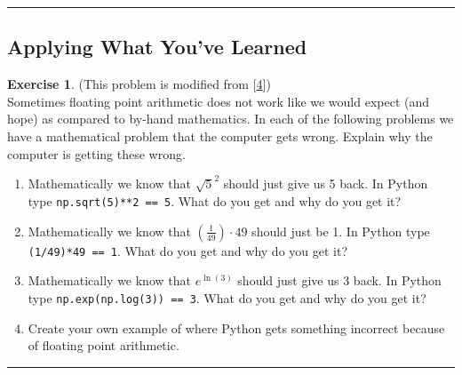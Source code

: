\documentclass[
]{book}
\providecommand{\tightlist}{%
  \setlength{\itemsep}{0pt}\setlength{\parskip}{0pt}}
\theoremstyle{definition}
\theoremstyle{definition}
\theoremstyle{definition}
\newtheorem{exercise}{Exercise}[chapter]
\theoremstyle{remark}
\begin{document}
\begin{center}\rule{0.5\linewidth}{0.5pt}\end{center}

\hypertarget{applying-what-youve-learned}{%
\subsection{Applying What You've Learned}\label{applying-what-youve-learned}}

\begin{exercise}
\protect\hypertarget{exr:unnamed-chunk-62}{}{\label{exr:unnamed-chunk-62} }(This problem is modified from {[}\protect\hyperlink{ref-chartier}{4}{]})\\
Sometimes floating point arithmetic does not work like we would expect (and hope) as compared to by-hand mathematics. In each of the following problems we have a mathematical problem that the computer gets wrong. Explain why the computer is getting these wrong.

\begin{enumerate}
\def\labelenumi{\alph{enumi}.}
\tightlist
\item
  Mathematically we know that \(\sqrt{5}^2\) should just give us 5 back. In Python type \texttt{np.sqrt(5)**2\ ==\ 5}. What do you get and why do you get it?
\item
  Mathematically we know that \(\left( \frac{1}{49} \right) \cdot 49\) should just be 1. In Python type \texttt{(1/49)*49\ ==\ 1}. What do you get and why do you get it?
\item
  Mathematically we know that \(e^{\ln(3)}\) should just give us 3 back. In Python type \texttt{np.exp(np.log(3))\ ==\ 3}. What do you get and why do you get it?
\item
  Create your own example of where Python gets something incorrect because of floating point arithmetic.
\end{enumerate}
\end{exercise}

\begin{center}\rule{0.5\linewidth}{0.5pt}\end{center}
\end{document}
